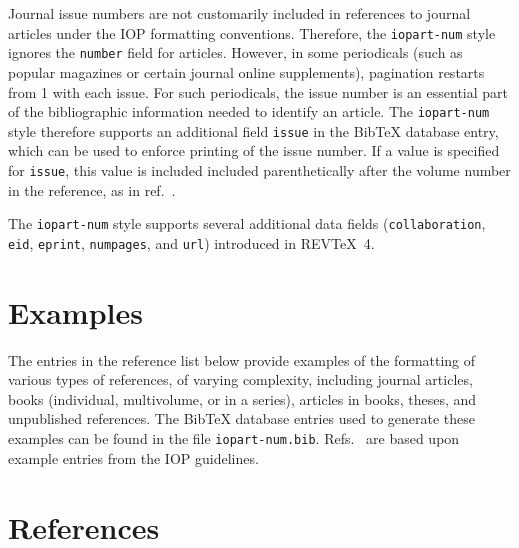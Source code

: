 \documentclass[12pt]{iopart}
\newcommand{\BibTeX}{Bib\TeX}
\newcommand{\REVTeX}{REV\TeX}
\begin{document}
Journal issue numbers are not customarily included in references to
journal articles under the IOP formatting conventions.
Therefore, the
\texttt{iopart-num} style ignores the
\verb+number+ field for articles.
However, in some periodicals (such as popular magazines or certain
journal online supplements), pagination restarts from 1 with each
issue.  For such periodicals, the issue number is an essential part of
the bibliographic information needed to identify an article.  The
\texttt{iopart-num} style therefore supports an additional field
\verb+issue+ in the \BibTeX{} database entry, which can be used to
enforce printing of the issue number.  If a value is specified for
\verb+issue+, this value is included included parenthetically after the volume
number in the reference, as in
ref.~\cite{zamfir2005:132te-beta-enam04}.

The \texttt{iopart-num} style supports several additional data fields
(\verb+collaboration+, \verb+eid+, \verb+eprint+,
\verb+numpages+, and \verb+url+) introduced in
\REVTeX{}~4.


\section{Examples}

The entries in the reference list below provide examples of the
formatting of various types of references, of varying complexity,
including journal articles, books (individual, multivolume, or in a
series), articles in books, theses, and unpublished references.  The
\BibTeX{} database entries used to generate these examples can be
found in the file \texttt{iopart-num.bib}.
Refs.~\cite{ex1,ex2,ex3,ex4,ex5,ex6,ex7,ex8} are based upon example entries
from the IOP guidelines.

\section*{References}

\end{document}
